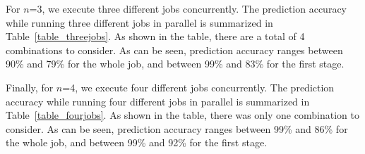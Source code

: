 \noindent
For $n$=3, we execute three different jobs concurrently. The prediction accuracy while running three different jobs in parallel is summarized in Table~\ref{table_threejobs}. As shown in the table, there are a total of 4 combinations to consider. As can be seen, prediction accuracy ranges between 90\% and 79\% for the whole job, and between 99\% and 83\% for the first stage.

\noindent
Finally, for $n$=4, we execute four different jobs concurrently. The prediction accuracy while running four different jobs in parallel is summarized in Table~\ref{table_fourjobs}. As shown in the table, there was only one combination to consider. As can be seen, prediction accuracy ranges between 99\% and 86\% for the whole job, and between 99\% and 92\% for the first stage.














